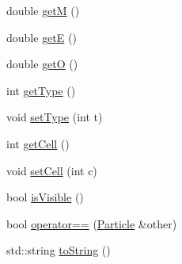 \begin{DoxyCompactItemize}
\item 
double \hyperlink{classSimulation_1_1Particle_aa1ca800f9be9dd4bd6c604f608095b24}{get\-M} ()
\item 
double \hyperlink{classSimulation_1_1Particle_ad449ae6dec0265efb91b7a714563fa12}{get\-E} ()
\item 
double \hyperlink{classSimulation_1_1Particle_abef7a42b32e938861884c958019cf41b}{get\-O} ()
\item 
int \hyperlink{classSimulation_1_1Particle_a0581d7b629eb17ac5bef8e934852ca8b}{get\-Type} ()
\item 
void \hyperlink{classSimulation_1_1Particle_a03487469e558306b9d770fb547ab23a3}{set\-Type} (int t)
\item 
int \hyperlink{classSimulation_1_1Particle_a7e74baf0c324e1474f6e5a4a072e5e8b}{get\-Cell} ()
\item 
void \hyperlink{classSimulation_1_1Particle_a701c977a46c66ac52c901eb9ee517389}{set\-Cell} (int c)
\item 
bool \hyperlink{classSimulation_1_1Particle_a28a301c6d1f08f5b77bd091d79872517}{is\-Visible} ()
\item 
bool \hyperlink{classSimulation_1_1Particle_a5034babb77618a56e00927d8891afabe}{operator==} (\hyperlink{classSimulation_1_1Particle}{Particle} \&other)
\item 
std\-::string \hyperlink{classSimulation_1_1Particle_a07d071a0f91f8ce7413201a6db3afe7b}{to\-String} ()
\end{DoxyCompactItemize}
